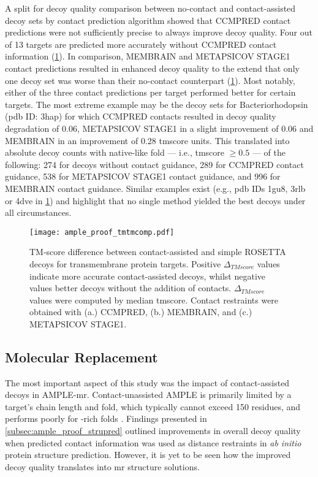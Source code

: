 A split for decoy quality comparison between no-contact and contact-assisted decoy sets by contact prediction algorithm showed that CCMPRED contact predictions were not sufficiently precise to always improve decoy quality. Four out of 13 targets are predicted more accurately without CCMPRED contact information (\cref{fig:ample_proof_tmtmcomp}). In comparison, MEMBRAIN and METAPSICOV STAGE1 contact predictions resulted in enhanced decoy quality to the extend that only one decoy set was worse than their no-contact counterpart (\cref{fig:ample_proof_tmtmcomp}). Most notably, either of the three contact predictions per target performed better for certain targets. The most extreme example may be the decoy sets for Bacteriorhodopsin (\gls{pdb} ID: 3hap) for which CCMPRED contacts resulted in decoy quality degradation of 0.06, METAPSICOV STAGE1 in a slight improvement of 0.06 and MEMBRAIN in an improvement of 0.28 \gls{tmscore} units. This translated into absolute decoy counts with native-like fold --- i.e., \gls{tmscore} $\geq 0.5$ --- of the following: 274 for decoys without contact guidance, 289 for CCMPRED contact guidance, 538 for METAPSICOV STAGE1 contact guidance, and 996 for MEMBRAIN contact guidance. Similar examples exist (e.g., \gls{pdb} IDs 1gu8, 3rlb or 4dve in \cref{fig:ample_proof_tmtmcomp}) and highlight that no single method yielded the best decoys under all circumstances.

\begin{figure}[H]
    \centering
    \texttt{[image: ample\_proof\_tmtmcomp.pdf]}
    \caption[TM-score difference between contact-assisted and simple decoys]{TM-score difference between contact-assisted and simple ROSETTA decoys for transmembrane protein targets. Positive $\Delta_{TMscore}$ values indicate more accurate contact-assisted decoys, whilst negative values better decoys without the addition of contacts. $\Delta_{TMscore}$ values were computed by median \gls{tmscore}. Contact restraints were obtained with (a.) CCMPRED, (b.) MEMBRAIN, and (c.) METAPSICOV STAGE1.}
    \label{fig:ample_proof_tmtmcomp}
\end{figure}

\subsection{Molecular Replacement}
The most important aspect of this study was the impact of contact-assisted decoys in AMPLE-\gls{mr}. Contact-unassisted AMPLE is primarily limited by a target's chain length and fold, which typically cannot exceed 150 residues, and performs poorly for \textbeta-rich folds \cite{Bibby2012-lm}. Findings presented in \cref{subsec:ample_proof_strupred} outlined improvements in overall decoy quality when predicted contact information was used as distance restraints in \textit{ab initio} protein structure prediction. However, it is yet to be seen how the improved decoy quality translates into \gls{mr} structure solutions.

